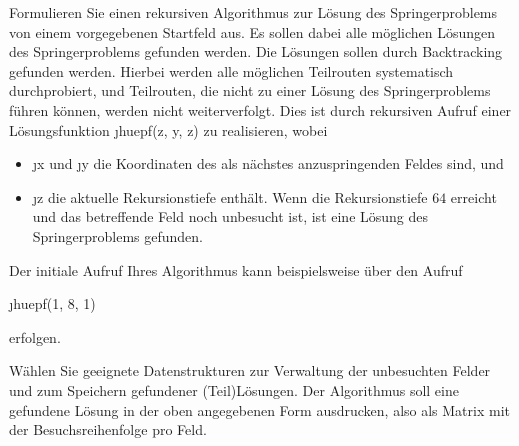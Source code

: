 \documentclass{bschlangaul-aufgabe}
\begin{document}
\noindent
Formulieren Sie einen rekursiven Algorithmus zur Lösung des
Springerproblems von einem vorgegebenen Startfeld aus. Es sollen dabei
alle möglichen Lösungen des Springerproblems gefunden werden. Die
Lösungen sollen durch Backtracking gefunden werden. Hierbei werden alle
möglichen Teilrouten systematisch durchprobiert, und Teilrouten, die
nicht zu einer Lösung des Springerproblems führen können, werden nicht
weiterverfolgt. Dies ist durch rekursiven Aufruf einer Lösungsfunktion
\j{huepf(z, y, z)} zu realisieren, wobei

\begin{itemize}

\item \j{x} und \j{y} die Koordinaten des als nächstes anzuspringenden
Feldes sind, und

\item \j{z} die aktuelle Rekursionstiefe enthält. Wenn die
Rekursionstiefe $64$ erreicht und das betreffende Feld noch unbesucht ist,
ist eine Lösung des Springerproblems gefunden.
\end{itemize}

Der initiale Aufruf Ihres Algorithmus kann beispielsweise über den
Aufruf

\begin{center}
\j{huepf(1, 8, 1)}
\end{center}

erfolgen.

Wählen Sie geeignete Datenstrukturen zur Verwaltung der unbesuchten
Felder und zum Speichern gefundener (Teil)Lösungen. Der Algorithmus soll
eine gefundene Lösung in der oben angegebenen Form ausdrucken, also als
Matrix mit der Besuchsreihenfolge pro Feld.

\begin{liAntwort}
\end{liAntwort}
\end{document}
